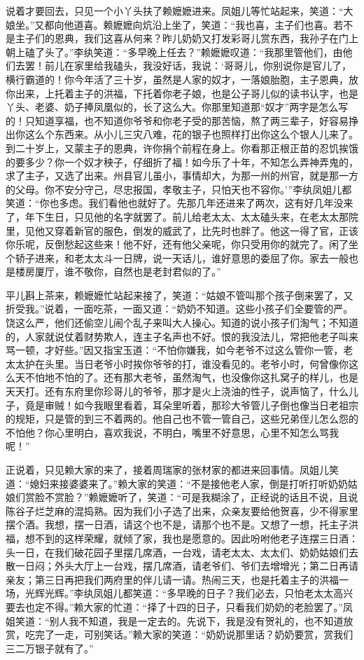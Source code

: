 说着才要回去，只见一个小丫头扶了赖嬷嬷进来。凤姐儿等忙站起来，笑道：“大娘坐。”又都向他道喜。赖嬷嬷向炕沿上坐了，笑道：“我也喜，主子们也喜。若不是主子们的恩典，我们这喜从何来？昨儿奶奶又打发彩哥儿赏东西，我孙子在门上朝上磕了头了。”李纨笑道：“多早晚上任去？”赖嬷嬷叹道：“我那里管他们，由他们去罢！前儿在家里给我磕头，我没好话，我说：‘哥哥儿，你别说你是官儿了，横行霸道的！你今年活了三十岁，虽然是人家的奴才，一落娘胎胞，主子恩典，放你出来，上托着主子的洪福，下托着你老子娘，也是公子哥儿似的读书认字，也是丫头、老婆、奶子捧凤凰似的，长了这么大。你那里知道那“奴才”两字是怎么写的！只知道享福，也不知道你爷爷和你老子受的那苦恼，熬了两三辈子，好容易挣出你这么个东西来。从小儿三灾八难，花的银子也照样打出你这么个银人儿来了。到二十岁上，又蒙主子的恩典，许你捐个前程在身上。你看那正根正苗的忍饥挨饿的要多少？你一个奴才秧子，仔细折了福！如今乐了十年，不知怎么弄神弄鬼的，求了主子，又选了出来。州县官儿虽小，事情却大，为那一州的州官，就是那一方的父母。你不安分守己，尽忠报国，孝敬主子，只怕天也不容你。’”李纨凤姐儿都笑道：“你也多虑。我们看他也就好了。先那几年还进来了两次，这有好几年没来了，年下生日，只见他的名字就罢了。前儿给老太太、太太磕头来，在老太太那院里，见他又穿着新官的服色，倒发的威武了，比先时也胖了。他这一得了官，正该你乐呢，反倒愁起这些来！他不好，还有他父亲呢，你只受用你的就完了。闲了坐个轿子进来，和老太太斗一日牌，说一天话儿，谁好意思的委屈了你。家去一般也是楼房厦厅，谁不敬你，自然也是老封君似的了。”

平儿斟上茶来，赖嬷嬷忙站起来接了，笑道：“姑娘不管叫那个孩子倒来罢了，又折受我。”说着，一面吃茶，一面又道：“奶奶不知道。这些小孩子们全要管的严。饶这么严，他们还偷空儿闹个乱子来叫大人操心。知道的说小孩子们淘气；不知道的，人家就说仗着财势欺人，连主子名声也不好。恨的我没法儿，常把他老子叫来骂一顿，才好些。”因又指宝玉道：“不怕你嫌我，如今老爷不过这么管你一管，老太太护在头里。当日老爷小时挨你爷爷的打，谁没看见的。老爷小时，何曾像你这么天不怕地不怕的了。还有那大老爷，虽然淘气，也没像你这扎窝子的样儿，也是天天打。还有东府里你珍哥儿的爷爷，那才是火上浇油的性子，说声恼了，什么儿子，竟是审贼！如今我眼里看着，耳朵里听着，那珍大爷管儿子倒也像当日老祖宗的规矩，只是管的到三不着两的。他自己也不管一管自己，这些兄弟侄儿怎么怨的不怕他？你心里明白，喜欢我说，不明白，嘴里不好意思，心里不知怎么骂我呢！”

正说着，只见赖大家的来了，接着周瑞家的张材家的都进来回事情。凤姐儿笑道：“媳妇来接婆婆来了。”赖大家的笑道：“不是接他老人家，倒是打听打听奶奶姑娘们赏脸不赏脸？”赖嬷嬷听了，笑道：“可是我糊涂了，正经说的话且不说，且说陈谷子烂芝麻的混捣熟。因为我们小子选了出来，众亲友要给他贺喜，少不得家里摆个酒。我想，摆一日酒，请这个也不是，请那个也不是。又想了一想，托主子洪福，想不到的这样荣耀，就倾了家，我也是愿意的。因此吩咐他老子连摆三日酒：头一日，在我们破花园子里摆几席酒，一台戏，请老太太、太太们、奶奶姑娘们去散一日闷；外头大厅上一台戏，摆几席酒，请老爷们、爷们去增增光；第二日再请亲友；第三日再把我们两府里的伴儿请一请。热闹三天，也是托着主子的洪福一场，光辉光辉。”李纨凤姐儿都笑道：“多早晚的日子？我们必去，只怕老太太高兴要去也定不得。”赖大家的忙道：“择了十四的日子，只看我们奶奶的老脸罢了。”凤姐笑道：“别人我不知道，我是一定去的。先说下，我是没有贺礼的，也不知道放赏，吃完了一走，可别笑话。”赖大家的笑道：“奶奶说那里话？奶奶要赏，赏我们三二万银子就有了。”

